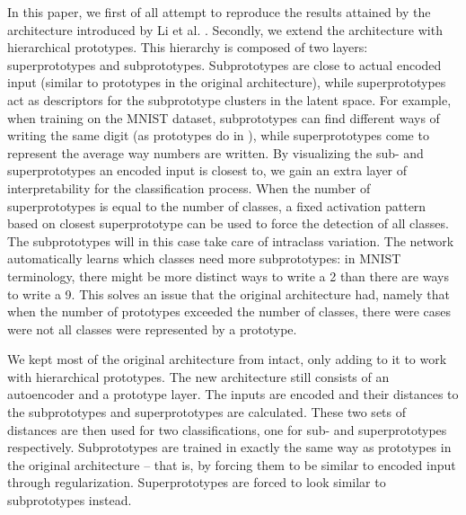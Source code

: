 In this paper, we first of all attempt to reproduce the results attained by the architecture introduced by Li et al. \citep{li2018deep}. Secondly, we extend the architecture with hierarchical prototypes. This hierarchy is composed of two layers: superprototypes and subprototypes. Subprototypes are close to actual encoded input (similar to prototypes in the original architecture), while superprototypes act as descriptors for the subprototype clusters in the latent space. For example, when training on the MNIST dataset, subprototypes can find different ways of writing the same digit (as prototypes do in \citep{li2018deep}), while superprototypes come to represent the average way numbers are written. By visualizing the sub- and superprototypes an encoded input is closest to, we gain an extra layer of interpretability for the classification process. When the number of superprototypes is equal to the number of classes, a fixed activation pattern based on closest superprototype can be used to force the detection of all classes. The subprototypes will in this case take care of intraclass variation. The network automatically learns which classes need more subprototypes: in MNIST terminology, there might be more distinct ways to write a 2 than there are ways to write a 9. This solves an issue that the original architecture \citep{li2018deep} had, namely that when the number of prototypes exceeded the number of classes, there were cases were not all classes were represented by a prototype.

We kept most of the original architecture from \citep{li2018deep} intact, only adding to it to work with hierarchical prototypes. The new architecture still consists of an autoencoder and a prototype layer. The inputs are encoded and their distances to the subprototypes and superprototypes are calculated. These two sets of distances are then used for two classifications, one for sub- and superprototypes respectively. Subprototypes are trained in exactly the same way as prototypes in the original architecture -- that is, by forcing them to be similar to encoded input through regularization. Superprototypes are forced to look similar to subprototypes instead.
